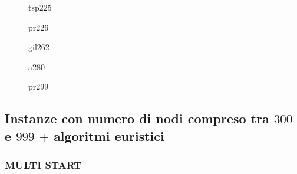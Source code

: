 \documentclass[11pt]{article}
\begin{document}
\begin{figure}[htbp]
    \centering
    \label{fig:tsp225}
    \caption{tsp225}
\end{figure}

\begin{figure}[htbp]
    \centering
    \label{fig:pr226}
    \caption{pr226}
\end{figure}

\begin{figure}[htbp]
    \centering
    \label{fig:gil262}
    \caption{gil262}
\end{figure}

\begin{figure}[htbp]
    \centering
    \label{fig:a280}
    \caption{a280}
\end{figure}

\begin{figure}[htbp]
    \centering
    \label{fig:pr299}
    \caption{pr299}
\end{figure}

\FloatBarrier

\subsection*{Instanze con numero di nodi compreso tra \textbf{$300$} e \textbf{$999$} $+$ algoritmi euristici}

\subsubsection*{MULTI START}
\end{document}
